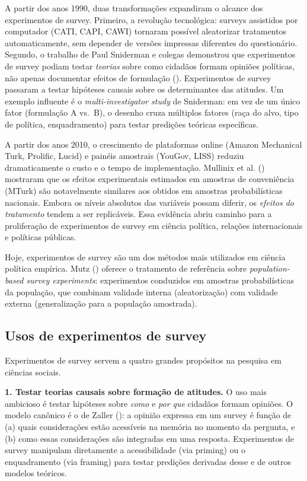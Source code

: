\documentclass[
]{article}
\begin{document}
A partir dos anos 1990, duas transformações expandiram o alcance dos experimentos de survey. Primeiro, a revolução tecnológica: surveys assistidos por computador (CATI, CAPI, CAWI) tornaram possível aleatorizar tratamentos automaticamente, sem depender de versões impressas diferentes do questionário. Segundo, o trabalho de Paul Sniderman e colegas demonstrou que experimentos de survey podiam testar \emph{teorias} sobre como cidadãos formam opiniões políticas, não apenas documentar efeitos de formulação (). Experimentos de survey passaram a testar hipóteses causais sobre os determinantes das atitudes. Um exemplo influente é o \emph{multi-investigator study} de Sniderman: em vez de um único fator (formulação A vs.~B), o desenho cruza múltiplos fatores (raça do alvo, tipo de política, enquadramento) para testar predições teóricas específicas.

A partir dos anos 2010, o crescimento de plataformas online (Amazon Mechanical Turk, Prolific, Lucid) e painéis amostrais (YouGov, LISS) reduziu dramaticamente o custo e o tempo de implementação. Mullinix et al. () mostraram que os efeitos experimentais estimados em amostras de conveniência (MTurk) são notavelmente similares aos obtidos em amostras probabilísticas nacionais. Embora os níveis absolutos das variáveis possam diferir, os \emph{efeitos do tratamento} tendem a ser replicáveis. Essa evidência abriu caminho para a proliferação de experimentos de survey em ciência política, relações internacionais e políticas públicas.

Hoje, experimentos de survey são um dos métodos mais utilizados em ciência política empírica. Mutz () oferece o tratamento de referência sobre \emph{population-based survey experiments}: experimentos conduzidos em amostras probabilísticas da população, que combinam validade interna (aleatorização) com validade externa (generalização para a população amostrada).

\subsection{Usos de experimentos de survey}\label{usos-de-experimentos-de-survey}

Experimentos de survey servem a quatro grandes propósitos na pesquisa em ciências sociais.

\textbf{1. Testar teorias causais sobre formação de atitudes.} O uso mais ambicioso é testar hipóteses sobre \emph{como} e \emph{por que} cidadãos formam opiniões. O modelo canônico é o de Zaller (): a opinião expressa em um survey é função de (a) quais considerações estão acessíveis na memória no momento da pergunta, e (b) como essas considerações são integradas em uma resposta. Experimentos de survey manipulam diretamente a acessibilidade (via priming) ou o enquadramento (via framing) para testar predições derivadas desse e de outros modelos teóricos.
\end{document}
